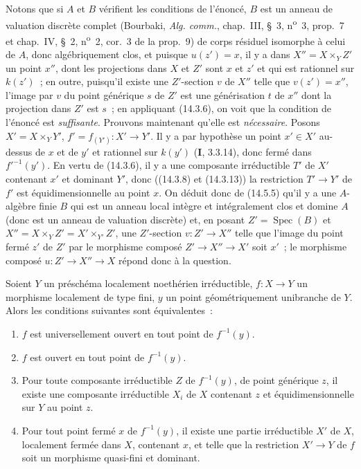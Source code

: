 
Notons que si $A$ et $B$ vérifient les conditions de l'énoncé, $B$ est un anneau
de valuation discrète complet (Bourbaki, \emph{Alg. comm.}, chap.~III, \S~3,
n\textsuperscript{o}~3, prop.~7 et chap.~IV, \S~2, n\textsuperscript{o}~2,
cor.~3 de la prop.~9) de corps résiduel isomorphe à celui de $A$, donc
algébriquement clos, et puisque $u(z')=x$, il y a dans $X''=X\times_Y Z'$ un point
$x''$, dont les projections dans $X$ et $Z'$ sont $x$ et $z'$ et qui est rationnel
sur $k(z')$~; en outre, puisqu'il existe une $Z'$-section $v$ de $X''$ telle que
$v(z')=x''$, l'image par $v$ du point générique $s$ de $Z'$ est une générisation
$t$ de $x''$ dont la projection dans $Z'$ est $s$~; en appliquant (14.3.6), on voit
que la condition de l'énoncé est \emph{suffisante}. Prouvons maintenant qu'elle est
\emph{nécessaire}. Posons $X'=X\times_Y Y'$, $f'=f_{(Y')}:X'\to Y'$. Il y a par
hypothèse un point $x'\in X'$ au-dessus de $x$ et de $y'$ et rationnel sur $k(y')$
(\textbf{I}, 3.3.14), donc fermé dans $f'^{-1}(y')$. En vertu de (14.3.6), il y a
une composante irréductible $T'$ de $X'$ contenant $x'$ et dominant $Y'$, donc
((14.3.8) et (14.3.13)) la restriction $T'\to Y'$ de $f'$ est équidimensionnelle au
point $x$. On déduit donc de (14.5.5) qu'il y a une $A$-algèbre finie $B$ qui est
un anneau local intègre et intégralement clos et domine $A$ (donc est un anneau de
valuation discrète) et, en posant $Z'=\operatorname{Spec}(B)$ et
$X''=X\times_Y Z'=X'\times_{Y'}Z'$, une $Z'$-section $v:Z'\to X''$ telle que
l'image du point fermé $z'$ de $Z'$ par le morphisme composé $Z'\to X''\to X'$ soit
$x'$~; le morphisme composé $u:Z'\to X''\to X$ répond donc à la question.

\begin{proposition}[14.5.9]
\label{IV.14.5.9-fr}
Soient $Y$ un préschéma localement noethérien irréductible, $f:X\to Y$ un
morphisme localement de type fini, $y$ un point géométriquement unibranche de $Y$.
Alors les conditions suivantes sont équivalentes~:
\begin{enumerate}[label=\emph{\alph*)}]
  \item $f$ est universellement ouvert en tout point de $f^{-1}(y)$.
  \item $f$ est ouvert en tout point de $f^{-1}(y)$.
  \item Pour toute composante irréductible $Z$ de $f^{-1}(y)$, de point générique
  $z$, il existe une composante irréductible $X_i$ de $X$ contenant $z$ et
  équidimensionnelle sur $Y$ au point $z$.
  \item Pour tout point fermé $x$ de $f^{-1}(y)$, il existe une partie irréductible
  $X'$ de $X$, localement fermée dans $X$, contenant $x$, et telle que la
  restriction $X'\to Y$ de $f$ soit un morphisme quasi-fini et dominant.
\end{enumerate}
\end{proposition}

